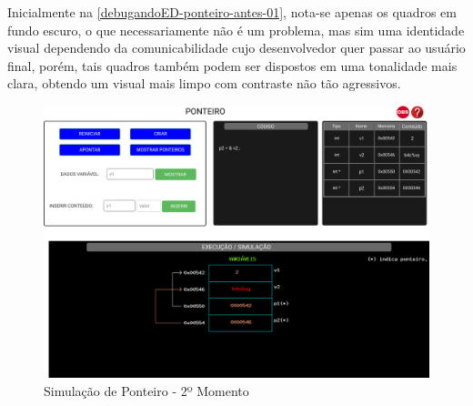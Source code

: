 Inicialmente na \autoref{debugandoED-ponteiro-antes-01}, nota-se apenas os quadros em fundo escuro, o que necessariamente não é um problema, mas sim uma identidade visual dependendo da comunicabilidade cujo desenvolvedor quer passar ao usuário final, porém, tais quadros também podem ser dispostos em uma tonalidade mais clara, obtendo um visual mais limpo com contraste não tão agressivos.

\begin{figure}[htb]
    \begin{center}
	    \includegraphics[scale=0.25]{figs/debugandoED-ponteiro-antes-02.png}
	\end{center}
    \caption{\label{debugandoED-ponteiro-antes-02}Simulação de Ponteiro - 2º Momento}
\end{figure}

